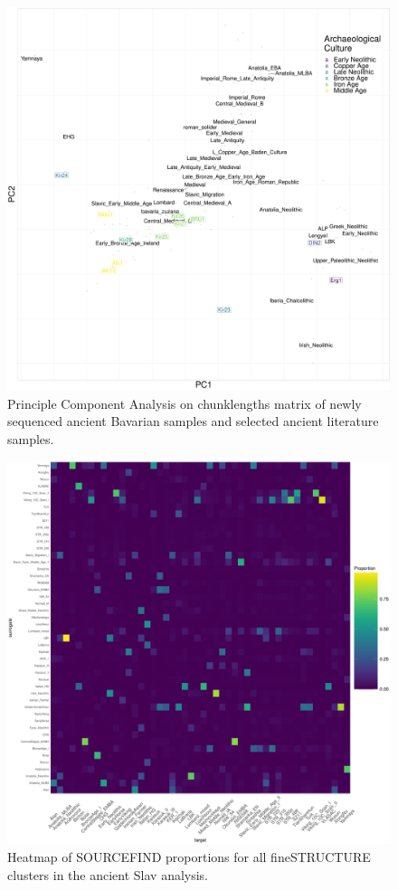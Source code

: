 \begin{figure}[htp]
    \centering
    \includegraphics[width=1.0\textwidth]{../images/appendix/chromopainter_PCA_ancients_Bavaria.pdf}
    \caption{Principle Component Analysis on chunklengths matrix of newly sequenced ancient Bavarian samples and selected ancient literature samples.}
    \label{fig:chromopainter_PCA_ancients_Bavaria}
\end{figure}

\begin{figure}[htp]
    \centering
    \includegraphics[width=1.0\textwidth]{../images/appendix/SF_heatmap_slavs.pdf}
    \caption{Heatmap of SOURCEFIND proportions for all fineSTRUCTURE clusters in the ancient Slav analysis.}
    \label{fig:SF_heatmap_slavs}
\end{figure}


